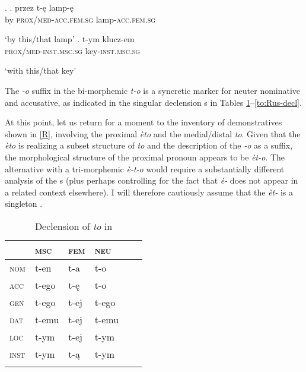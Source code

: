 \ex. 
\ag. przez t-\k{e} lamp-\k{e}\\
by \textsc{prox/med-acc.fem.sg} lamp-\textsc{acc.fem.sg}\\
\strut `by this/that lamp'
\bg. t-ym klucz-em\\
\textsc{prox/med-inst.msc.sg} key-\textsc{inst.msc.sg}\\
\strut `with this/that key'

The \textit{-o} suffix in the bi-morphemic \textit{t-o} is a syncretic marker for neuter nominative and accusative, as indicated in the singular declension s in Tables \ref{to:decl}--\ref{to:Rus-decl}.
\par
At this point, let us return for a moment to the inventory of  demonstratives shown in \ref{R}, involving the proximal \textit{\`eto} and the medial/distal \textit{to}.  Given that the  \textit{\`eto} is realizing a subset structure of \textit{to} and the description of the \textit{-o} as a suffix, the morphological structure of the  proximal pronoun appears to be \textit{\`et-o}. The alternative with a tri-mor\-phe\-mic \textit{\`e-t-o} would require a substantially different analysis of the  s (plus perhaps controlling for the fact that \textit{\`e-} does not appear in a related context elsewhere). I will therefore cautiously assume that the  \textit{\`et-} is a singleton .  


\begin{table}
\caption{Declension of \textit{to} in }
\label{to:decl} 
\begin{tabular}[t]{ l l l l l l }
\lsptoprule	
& \textsc{msc} & \textsc{fem} & \textsc{neu}\\\hline
  \textsc{nom} & t-en & t-a & t-o\cellcolor[gray]{0.9}\\
  \textsc{acc}  & t-ego & t-\k{e} & t-o\cellcolor[gray]{0.9}\\
  \textsc{gen} & t-ego & t-ej & t-ego\\
  \textsc{dat} & t-emu & t-ej & t-emu\\
  \textsc{loc}  & t-ym & t-ej & t-ym\\
  \textsc{inst} & t-ym & t-\k{a} & t-ym\\
  \lspbottomrule
\end{tabular}
\end{table}

